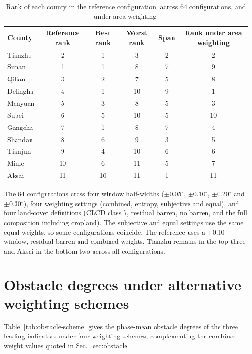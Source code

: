 \documentclass[preprint,11pt,authoryear]{elsarticle}
\begin{document}
\begin{table}[htbp]
\centering
\caption{Rank of each county in the reference configuration, across 64 configurations, and under area weighting.}
\label{tab:countyrank}
\footnotesize
\setlength{\tabcolsep}{4pt}
\begin{tabular}{lccccc}
\toprule
County & Reference rank & Best rank & Worst rank & Span & Rank under area weighting \\
\midrule
Tianzhu & 2 & 1 & 3 & 2 & 2 \\
Sunan & 1 & 1 & 8 & 7 & 9 \\
Qilian & 3 & 2 & 7 & 5 & 8 \\
Delingha & 4 & 1 & 10 & 9 & 1 \\
Menyuan & 5 & 3 & 8 & 5 & 3 \\
Subei & 6 & 5 & 10 & 5 & 10 \\
Gangcha & 7 & 1 & 8 & 7 & 4 \\
Shandan & 8 & 6 & 9 & 3 & 5 \\
Tianjun & 9 & 4 & 10 & 6 & 6 \\
Minle & 10 & 6 & 11 & 5 & 7 \\
Aksai & 11 & 10 & 11 & 1 & 11 \\
\bottomrule
\end{tabular}

\vspace{2pt}
{\scriptsize The 64 configurations cross four window half-widths ($\pm$0.05$^{\circ}$, $\pm$0.10$^{\circ}$, $\pm$0.20$^{\circ}$ and $\pm$0.30$^{\circ}$), four weighting settings (combined, entropy, subjective and equal), and four land-cover definitions (CLCD class 7, residual barren, no barren, and the full composition including cropland). The subjective and equal settings use the same equal weights, so some configurations coincide. The reference uses a $\pm$0.10$^{\circ}$ window, residual barren and combined weights. Tianzhu remains in the top three and Aksai in the bottom two across all configurations.}
\end{table}

\section{Obstacle degrees under alternative weighting schemes}
\label{app:obstacle}
Table~\ref{tab:obstacle-scheme} gives the phase-mean obstacle degrees of the three leading indicators under four weighting schemes, complementing the combined-weight values quoted in Sec.~\ref{sec:obstacle}.
\end{document}
